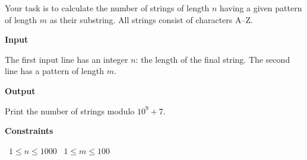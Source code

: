Your task is to calculate the number of strings of length $n$ having a given pattern of length $m$ as their substring. All strings consist of characters A–Z.

\vspace{0.3cm}\noindent\textbf{Input}

The first input line has an integer $n$: the length of the final string.
The second line has a pattern of length $m$.

\vspace{0.3cm}\noindent\textbf{Output}

Print the number of strings modulo $10^9+7$.

\vspace{0.3cm}\noindent\textbf{Constraints}

\textbullet\ $1 \le n \le 1000$
\textbullet\ $1 \le m \le 100$